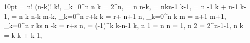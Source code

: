  10pt
 = {n! \over (n-k)! k!}, \Mf
\Fm \sum_{k=0}^n {n \choose k} = 2^n, \Mf
{} = {n \choose n-k}, \Mf
{} = {n\over k}{n-1 \choose k-1}, \Mf
{} = {n -1 \choose k} + {n-1 \choose k-1}, \Mf
{} = { n \choose k} { n-k \choose m-k}, \Mf
\Fm \sum_{k=0}^n {r+k \choose k} = { r+ n+1 \choose n}, \Mf
\Fm \sum_{k=0}^n {k \choose m} = { n+1 \choose m+1}, \Mf
\Fm \sum_{k=0}^n {r \choose k}{s \choose n -k} = {r+s \choose n}, \Mf
{} =  (-1)^k {k-n-1 \choose k}, \Mf
\Fm \Subset n 1 = \Subset n n = 1, \Mf
\Fm \Subset n 2 = 2^{n-1}-1, \Mf
\Fm \Subset n k = k  k +  {k-1}, \Mf
\EndDis
